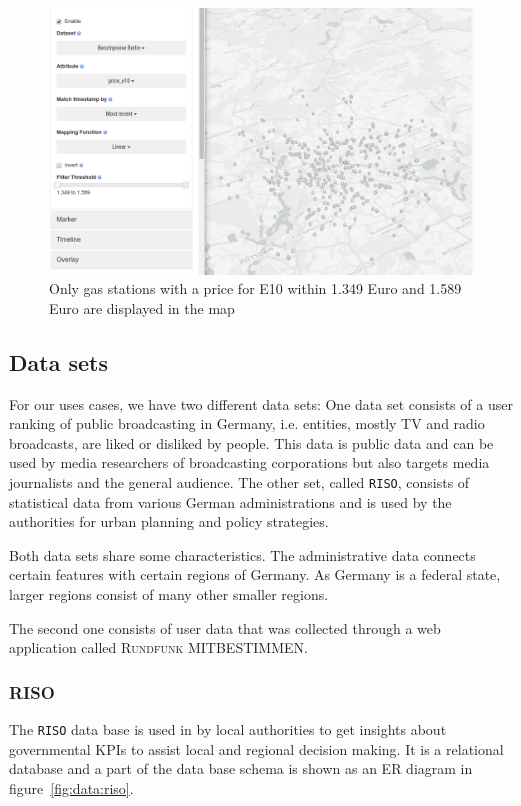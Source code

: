 \documentclass{article}
\newcommand{\rufu}{\textsc{Rundfunk MITBESTIMMEN}}
\newcommand{\riso}{\texttt{RISO}}
\begin{document}
\begin{figure}[h!]
  \centering
  \includegraphics[width=\textwidth]{images/existing-interactions-filter.png}
  \caption{ Only gas stations with a price for E10 within 1.349 Euro and 1.589 Euro are displayed in the map}
  \label{fig:analysis:interaction:existing:filter}
\end{figure}


\subsection{Data sets}
For our uses cases, we have two different data sets:
One data set consists of a user ranking of public broadcasting in Germany, i.e. entities, mostly TV and radio broadcasts, are liked or disliked by people.
This data is public data and can be used by media researchers of broadcasting corporations but also targets media journalists and the general audience.
The other set, called \riso{}, consists of statistical data from various German administrations and is used by the authorities for urban planning and policy strategies.

Both data sets share some characteristics.
The administrative data connects certain features with certain regions of Germany.
As Germany is a federal state, larger regions consist of many other smaller regions.

The second one consists of user data that was collected through a web application called \rufu{}.

\subsubsection{RISO}

The \riso{} data base is used in by local authorities to get insights about governmental KPIs to assist local and regional decision making.
It is a relational database and a part of the data base schema is shown as an ER diagram in figure~\ref{fig:data:riso}.
\end{document}
